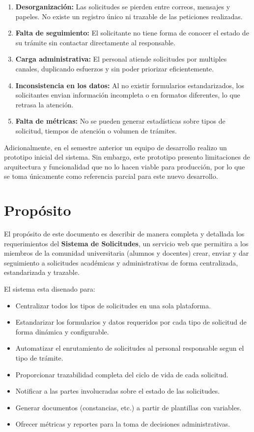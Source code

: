 \begin{enumerate}
    \item \textbf{Desorganización:} Las solicitudes se pierden entre correos, mensajes y papeles. No existe un registro único ni trazable de las peticiones realizadas.
    \item \textbf{Falta de seguimiento:} El solicitante no tiene forma de conocer el estado de su trámite sin contactar directamente al responsable.
    \item \textbf{Carga administrativa:} El personal atiende solicitudes por multiples canales, duplicando esfuerzos y sin poder priorizar eficientemente.
    \item \textbf{Inconsistencia en los datos:} Al no existir formularios estandarizados, los solicitantes envian información incompleta o en formatos diferentes, lo que retrasa la atención.
    \item \textbf{Falta de métricas:} No se pueden generar estadísticas sobre tipos de solicitud, tiempos de atención o volumen de trámites.
\end{enumerate}

Adicionalmente, en el semestre anterior un equipo de desarrollo realizo un prototipo inicial del sistema. Sin embargo, este prototipo presento limitaciones de arquitectura y funcionalidad que no lo hacen viable para producción, por lo que se toma únicamente como referencia parcial para este nuevo desarrollo.

\section{Propósito}

El propósito de este documento es describir de manera completa y detallada los requerimientos del \textbf{Sistema de Solicitudes}, un servicio web que permitira a los miembros de la comunidad universitaria (alumnos y docentes) crear, enviar y dar seguimiento a solicitudes académicas y administrativas de forma centralizada, estandarizada y trazable.

El sistema esta disenado para:

\begin{itemize}
    \item Centralizar todos los tipos de solicitudes en una sola plataforma.
    \item Estandarizar los formularios y datos requeridos por cada tipo de solicitud de forma dinámica y configurable.
    \item Automatizar el enrutamiento de solicitudes al personal responsable segun el tipo de trámite.
    \item Proporcionar trazabilidad completa del ciclo de vida de cada solicitud.
    \item Notificar a las partes involucradas sobre el estado de las solicitudes.
    \item Generar documentos (constancias, etc.) a partir de plantillas con variables.
    \item Ofrecer métricas y reportes para la toma de decisiones administrativas.
\end{itemize}

